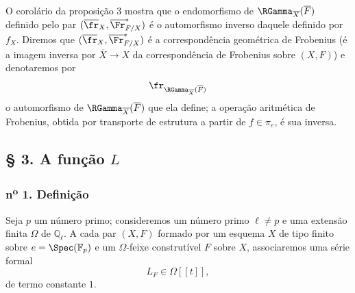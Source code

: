 O corolário da proposição 3 mostra que o endomorfismo de $\RGamma_{\overline X}(\overline F)$ definido pelo par $(\overline{\fr}_X,\overline{\Fr}^*_{F/X})$ é o automorfismo inverso daquele definido por $f_X$. Diremos que $(\overline{\fr}_X,\overline{\Fr}^*_{F/X})$ é a correspondência geométrica de Frobenius (é a imagem inversa por $\overline X\to X$ da correspondência de Frobenius sobre $(X,F)$) e denotaremos por
\[
\fr_{\RGamma_{\overline X}(\overline F)}
\]
o automorfismo de $\RGamma_{\overline X}(\overline F)$ que ela define; a operação aritmética de Frobenius, obtida por transporte de estrutura a partir de $f\in\pi_e$, é sua inversa.

\subsection*{§ 3. A função $L$}

\subsubsection*{n\textsuperscript{o} 1. Definição}

Seja $p$ um número primo; consideremos um número primo $\ell\ne p$ e uma extensão finita $\Omega$ de $\mathbb Q_\ell$. A cada par $(X,F)$ formado por um esquema $X$ de tipo finito sobre $e=\Spec(\mathbb F_p)$ e um $\Omega$-feixe construtível $F$ sobre $X$, associaremos uma série formal
\[
L_F\in\Omega[[t]],
\]
de termo constante $1$.


